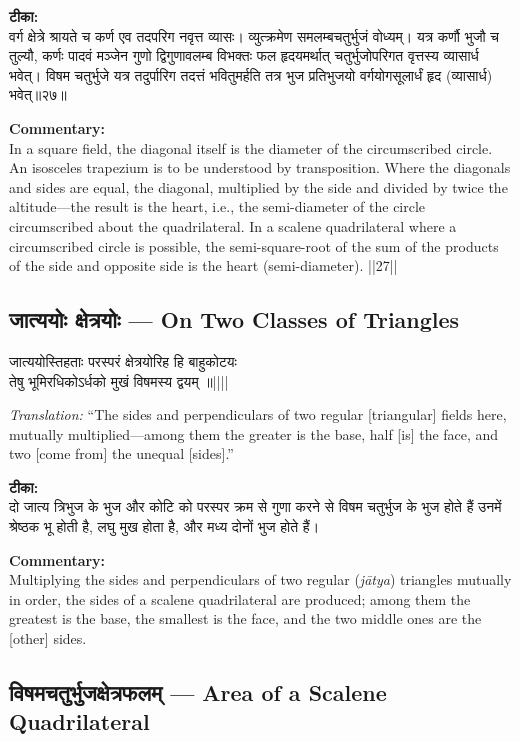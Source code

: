 \documentclass[10pt,a4paper]{article}
\newcommand{\dev}[1]{{\devanagarifont #1}}
\newcommand{\vnum}[1]{\hfill\textnormal{||#1||}}
\newenvironment{shloka}{%
  \begin{lrbox}{\shlokabox}
  \begin{minipage}{\dimexpr\textwidth-16pt\relax}%
  \devanagarifont\centering\setstretch{1.3}%
}{%
  \end{minipage}%
  \end{lrbox}%
  \par\medskip\noindent\fcolorbox{rulecolor}{versebg}{\usebox{\shlokabox}}\par\medskip
}
\newcommand{\bilingual}[2]{%
  \noindent%
  \begin{minipage}[t]{0.47\textwidth}%
    \setstretch{1.15}#1%
  \end{minipage}%
  \hfill%
  \vrule\hfill%
  \begin{minipage}[t]{0.47\textwidth}%
    \setstretch{1.15}#2%
  \end{minipage}%
  \par\medskip
}
\begin{document}
\bilingual{%
\textbf{टीका:}\\[0.3em]
वर्ग क्षेत्रे श्रायते च कर्ण एव तदपरिग नवृत्त व्यासः। व्युत्क्रमेण समलम्बचतुर्भुजं वोध्यम्। यत्र कर्णौ भुजौ च तुल्यौ, कर्णः पादवं मञ्जेन गुणो द्विगुणावलम्ब विभक्तः फल हृदयमर्थात् चतुर्भुजोपरिगत वृत्तस्य व्यासार्ध भवेत्। विषम चतुर्भुजे यत्र तदुर्पारिग तदत्तं भवितुमर्हति तत्र भुज प्रतिभुजयो वर्गयोगसूलार्धं हृद (व्यासार्ध) भवेत्॥२७॥
}{%
\textbf{Commentary:}\\[0.3em]
In a square field, the diagonal itself is the diameter of the circumscribed circle. An isosceles trapezium is to be understood by transposition. Where the diagonals and sides are equal, the diagonal, multiplied by the side and divided by twice the altitude---the result is the heart, i.e., the semi-diameter of the circle circumscribed about the quadrilateral. In a scalene quadrilateral where a circumscribed circle is possible, the semi-square-root of the sum of the products of the side and opposite side is the heart (semi-diameter). ||27||
}

\subsection{\dev{जात्ययोः क्षेत्रयोः} --- On Two Classes of Triangles}

\bilingual{%
\begin{shloka}
जात्ययोस्तिहताः परस्परं क्षेत्रयोरिह हि बाहुकोटयः\\
तेषु भूमिरधिकोऽर्धको मुखं विषमस्य द्वयम् ॥\vnum{}
\end{shloka}
}{%
\textit{Translation:} ``The sides and perpendiculars of two regular [triangular] fields here, mutually multiplied---among them the greater is the base, half [is] the face, and two [come from] the unequal [sides].''
}

\bilingual{%
\textbf{टीका:}\\[0.3em]
दो जात्य त्रिभुज के भुज और कोटि को परस्पर क्रम से गुणा करने से विषम चतुर्भुज के भुज होते हैं उनमें श्रेष्ठक भू होती है, लघु मुख होता है, और मध्य दोनों भुज होते हैं।
}{%
\textbf{Commentary:}\\[0.3em]
Multiplying the sides and perpendiculars of two regular (\textit{jātya}) triangles mutually in order, the sides of a scalene quadrilateral are produced; among them the greatest is the base, the smallest is the face, and the two middle ones are the [other] sides.
}

\subsection{\dev{विषमचतुर्भुजक्षेत्रफलम्} --- Area of a Scalene Quadrilateral}
\end{document}
